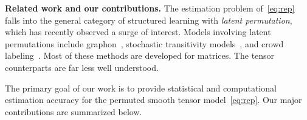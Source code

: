 \documentclass{article}
\theoremstyle{definition}
\begin{document}
{\bf Related work and our contributions.} The estimation problem of~\eqref{eq:rep} falls into the general category of structured learning with \emph{latent permutation}, which has recently observed a surge of interest. Models involving latent permutations include graphon~\cite{gao2021minimax,klopp2017oracle}, stochastic transitivity models~\cite{shah2019low}, and crowd labeling~\cite{li2019nearest}. Most of these methods are developed for matrices. The tensor counterparts are far less well understood. 


The primary goal of our work is to provide statistical and computational estimation accuracy for the permuted smooth tensor model~\eqref{eq:rep}. Our major contributions are summarized below.
\vspace{-.2cm}
\begin{table}[http]
    \centering
    \caption{\small Comparison of our results with previous works. $^*$We  list here only the result for infinitely smooth order-3 tensors. Our results allow general tensors of arbitrary order $m$ and smoothness $\alpha$; See Theorems~\ref{thm:LSE}-\ref{thm:BC} in Sections~\ref{sec:lse}-\ref{sec:borda}.}\label{tab:comp}
\end{table}
\vspace{-.3cm}
\end{document}
